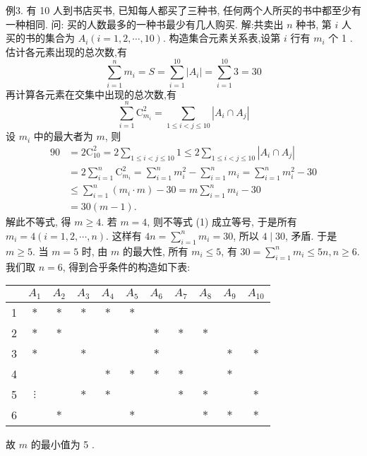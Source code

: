 例3. 有 10 人到书店买书, 已知每人都买了三种书, 任何两个人所买的书中都至少有一种相同.
问: 买的人数最多的一种书最少有几人购买.
解:共卖出 $n$ 种书, 第 $i$ 人买的书的集合为 $A_i(i=1,2, \cdots, 10)$. 构造集合元素关系表,设第 $i$ 行有 $m_i$ 个 1 .
估计各元素出现的总次数,有
$$
\sum_{i=1}^n m_i=S=\sum_{i=1}^{10}\left|A_i\right|=\sum_{i=1}^{10} 3=30
$$
再计算各元素在交集中出现的总次数,有
$$
\sum_{i=1}^n \mathrm{C}_{m_i}^2=\sum_{1 \leqslant i<j \leqslant 10}\left|A_i \cap A_j\right|
$$
设 $m_i$ 中的最大者为 $m$, 则
$$
\begin{aligned}
90 & =2 \mathrm{C}_{10}^2=2 \sum_{1 \leqslant i<j \leqslant 10} 1 \leqslant 2 \sum_{1 \leqslant i<j \leqslant 10}\left|A_i \cap A_j\right| \\
& =2 \sum_{i=1}^n \mathrm{C}_{m_i}^2=\sum_{i=1}^n m_i^2-\sum_{i=1}^n m_i=\sum_{i=1}^n m_i^2-30 \\
& \leqslant \sum_{i=1}^n\left(m_i \cdot m\right)-30=m \sum_{i=1}^n m_i-30 \\
& =30(m-1) .
\end{aligned}
$$
解此不等式, 得 $m \geqslant 4$. 若 $m=4$, 则不等式 (1) 成立等号, 于是所有 $m_i=4(i=1,2, \cdots, n)$. 这样有 $4 n=\sum_{i=1}^n m_i=30$, 所以 $4 \mid 30$, 矛盾.
于是 $m \geqslant 5$.
当 $m=5$ 时, 由 $m$ 的最大性, 所有 $m_i \leqslant 5$, 有 $30=\sum_{i=1}^n m_i \leqslant 5 n, n \geqslant 6$. 我们取 $n=6$, 得到合乎条件的构造如下表:
\begin{tabular}{|c|c|c|c|c|c|c|c|c|c|c|}
\hline & $A_1$ & $A_2$ & $A_3$ & $A_4$ & $A_5$ & $A_6$ & $A_7$ & $A_8$ & $A_9$ & $A_{10}$ \\
\hline 1 & $*$ & $*$ & $*$ & $*$ & $*$ & & & & & \\
\hline 2 & $*$ & $*$ & & & & $*$ & $*$ & $*$ & & \\
\hline 3 & $*$ & & $*$ & & & $*$ & & & $*$ & $*$ \\
\hline 4 & & & & $*$ & $*$ & $*$ & $*$ & & $*$ & \\
\hline 5 & $\vdots$ & & $*$ & $*$ & & & $*$ & $*$ & & $*$ \\
\hline 6 & & $*$ & & & $*$ & & & $*$ & $*$ & $*$ \\
\hline
\end{tabular}
故 $m$ 的最小值为 5 .



